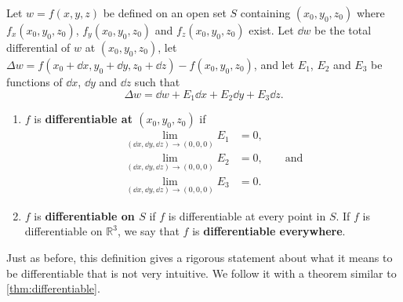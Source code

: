 \begin{definition}\label{def:multi_differentiability3}
Let $w=f(x,y,z)$ be defined on an open set $S$ containing $(x_0,y_0,z_0)$ where $f_x(x_0,y_0,z_0)$, $f_y(x_0,y_0,z_0)$ and $f_z(x_0,y_0,z_0)$ exist. Let $\dd w$ be the total differential of $w$ at $(x_0,y_0,z_0)$, let $\Delta w = f(x_0+\dd x,y_0+\dd y,z_0+\dd z) - f(x_0,y_0,z_0)$, and let $E_1$, $E_2$ and $E_3$ be functions of $\dd x$, $\dd y$ and $\dd z$  such that
\[\Delta w = \dd w + E_1\dd x + E_2\dd y + E_3\dd z.\]
\begin{enumerate}
	\item $f$ is \textbf{differentiable at $(x_0,y_0,z_0)$} if%
	\begin{align*}
	 \lim_{(\dd x,\dd y,\dd z)\to(0,0,0)}E_1 &=0,\\
	 \lim_{(\dd x,\dd y,\dd z)\to(0,0,0)}E_2 &=0,\qquad\text{and}\\
	 \lim_{(\dd x,\dd y,\dd z)\to(0,0,0)}E_3 &=0.
	\end{align*}
	\item	$f$ is \textbf{differentiable on $S$} if $f$ is differentiable at every point in $S$. If $f$ is differentiable on $\mathbb{R}^3$, we say that $f$ is \textbf{differentiable everywhere}.
\end{enumerate}
\end{definition}

Just as before, this definition gives a rigorous statement about what it means to be differentiable that is not very intuitive. We follow it with a theorem similar to \autoref{thm:differentiable}.


